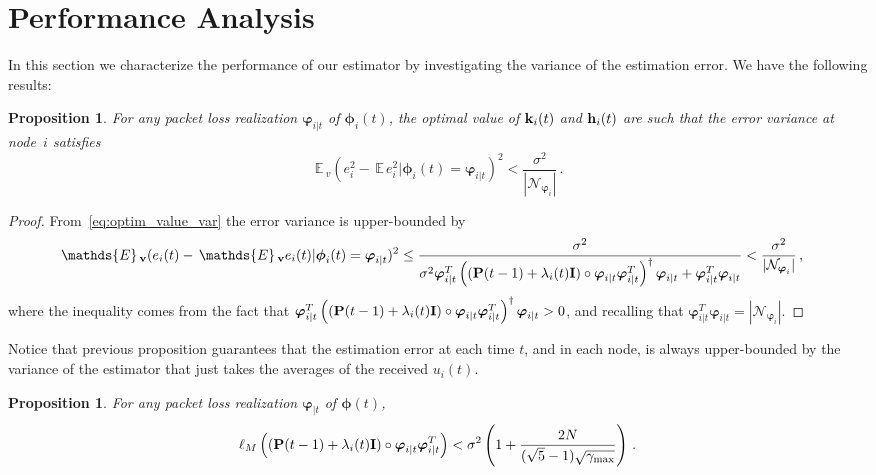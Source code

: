\documentclass[a4paper,notitlepage,onecolumn]{article}
\def\P{\mathds{P}}
\def\I{{\cal I}}
\def\k{{\bf k}}
\def\h{{\bf h}}
\def\v{{\bf v}}
\def\I{{\bf I}}
\def\P{{\bf P}}
\def\phib{\boldsymbol{\phi}}
\def\varphib{\boldsymbol{\varphi}}
\def\E{\,\mathds{E}\,}
\newtheorem{proposition}[theorem]{Proposition}
\numberwithin{equation}{section}
\begin{document}
\section{Performance Analysis}
\label{sec:performance_analysis}

In this section we characterize the performance of our estimator
by investigating the variance of the estimation error. We have the
following results:
\begin{proposition}
    \label{cor:bound-variance-node-i}
    For any packet loss realization $\varphib_{i|t}$ of $\phib_i(t)$, the optimal value of $\k_i(t)$ and $\h_i(t)$ are such that the error variance at node~$i$ satisfies
    $$
        \E_v (e_i^2-\E e_i^2|\phib_i(t)=\varphib_{i|t})^2 < \frac{\sigma^2}{|\mathcal{N}_{\varphib_i}|}\,.
    $$
\end{proposition}

\begin{proof}
From~\eqref{eq:optim_value_var} the error variance is upper-bounded
by
\begin{align*}
   \E_\v (e_i(t) - \E_\v e_i(t) | \phib_i(t) = \varphib_{i|t})^2 & \leq  \frac{\sigma^2}{\sigma^2\varphib_{i|t}^T \left((\P(t-1)+\lambda_i(t) \I) \circ \varphib_{i|t}\varphib_{i|t}^T\right)^\dag\varphib_{i|t} + \varphib_{i|t}^T \varphib_{i|t} } < \frac{\sigma^2}{ |\mathcal{N}_{\varphib_i}|}\,,
\end{align*}
where the inequality comes from the fact that $\varphib_{i|t}^T \left((\P(t-1)+\lambda_i(t) \I) \circ \varphib_{i|t}\varphib_{i|t}^T\right)^\dag\varphib_{i|t} > 0$, and recalling that $\varphib_{i|t}^T \varphib_{i|t} = |\mathcal{N}_{\varphib_i}|$.
\end{proof}
Notice that previous proposition guarantees that the
estimation error at each time $t$, and in each node, is
always upper-bounded by the variance of the estimator that
just takes the averages of the received $u_i(t)$.

\begin{proposition}
    \label{prop:bound-lM-Gamma}
    For any packet loss realization $\varphib_{|t}$ of $\phib(t)$,
    $$
        \ell_M \left((\P(t-1)+\lambda_i(t) \I) \circ \varphib_{i|t}\varphib_{i|t}^T \right) < \sigma^2 \left(1+\frac{2N}{(\sqrt{5}-1)\sqrt{\gamma_{\max}}}\right) \,.
    $$
\end{proposition}
\end{document}
